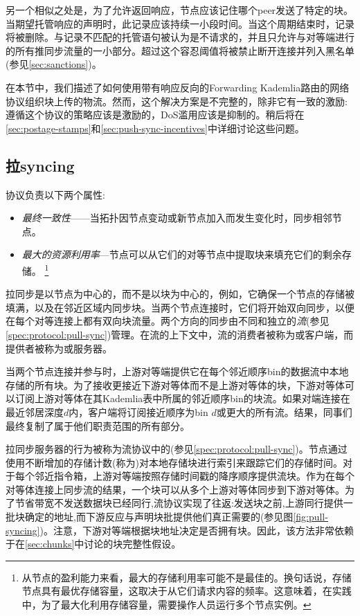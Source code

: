 另一个相似之处是，为了允许返回响应，节点应该记住哪个peer发送了特定的块。当期望托管响应的声明时，此记录应该持续一小段时间。当这个周期结束时，记录将被删除。与记录不匹配的托管语句被认为是不请求的，并且只允许与对等端进行的所有推同步流量的一小部分。超过这个容忍阈值将被禁止断开连接并列入黑名单(参见\ref{sec:sanctions})。

在本节中，我们描述了如何使用带有响应反向的Forwarding Kademlia路由的网络协议组织块上传的物流。然而，这个解决方案是不完整的，除非它有一致的激励:遵循这个协议的策略应该是激励的，DoS滥用应该是抑制的。稍后将在\ref{sec:postage-stamps}和\ref{sec:push-sync-incentives}中详细讨论这些问题。

\subsection{拉syncing\statusgreen}\label{sec:pull-syncing}

协议负责以下两个属性: 

\begin{itemize}
    \item \emph{最终一致性}——当拓扑因节点变动或新节点加入而发生变化时，同步相邻节点。
    \item \emph{最大的资源利用率}—节点可以从它们的对等节点中提取块来填充它们的剩余存储。%
%
\footnote{从节点的盈利能力来看，最大的存储利用率可能不是最佳的。换句话说，存储节点具有最优存储容量，这取决于从它们请求内容的频率。这意味着，在实践中，为了最大化利用存储容量，需要操作人员运行多个节点实例。}
\end{itemize}

拉同步是以节点为中心的，而不是以块为中心的，例如，它确保一个节点的存储被填满，以及在邻近区域内同步块。当两个节点连接时，它们将开始双向同步，以便在每个对等连接上都有双向块流量。两个方向的同步由不同和独立的\emph{流}(参见\ref{spec:protocol:pull-sync})管理。在流的上下文中，流的消费者被称为或客户端，而提供者被称为或服务器。 

当两个节点连接并参与时，上游对等端提供它在每个邻近顺序bin的数据流中本地存储的所有块。为了接收更接近下游对等体而不是上游对等体的块，下游对等体可以订阅上游对等体在其Kademlia表中所属的邻近顺序bin的块流。如果对端连接在最近邻居深度$d$内，客户端将订阅接近顺序为bin $d$或更大的所有流。结果，同事们最终复制了属于他们职责范围的所有部分。

拉同步服务器的行为被称为流协议中的(参见\ref{spec:protocol:pull-sync})。节点通过使用不断增加的存储计数(称为)对本地存储块进行索引来跟踪它们的存储时间。对于每个邻近指令箱，上游对等端按照存储时间戳的降序顺序提供流块。作为在每个对等体连接上同步流的结果，一个块可以从多个上游对等体同步到下游对等体。为了节省带宽不发送数据块已经同行,流协议实现了往返:发送块之前,上游同行提供一批块确定的地址,而下游反应与声明块批提供他们真正需要的(参见图\ref{fig:pull-syncing})。注意，下游对等端根据块地址决定是否拥有块。因此，该方法非常依赖于在\ref{sec:chunks}中讨论的块完整性假设。


